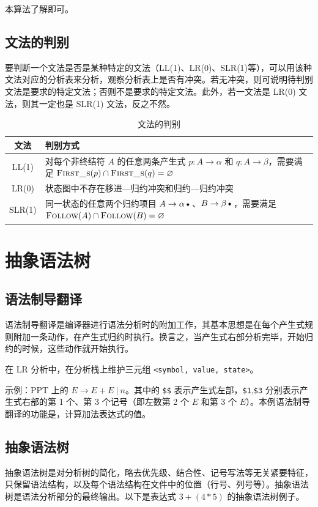 \documentclass[UTF8]{ctexart}
\newcommand\FOLLOW{\textsc{Follow}}
\newcommand\FIRSTS{\textsc{First\_s}}
\newcommand\D{\text{\textbullet}}
\newcommand\OR{\ |\ }
\newcommand\Emph[1]{\textcolor{cyan!80!black}{#1}}
\begin{document}
本算法了解即可。


\subsection{文法的判别}
要判断一个文法是否是某种特定的文法（LL(1)、LR(0)、SLR(1)等），可以用该种文法对应的\Emph{分析表}来分析，观察分析表上是否有冲突。若无冲突，则可说明待判别文法是要求的特定文法；否则不是要求的特定文法。此外，若一文法是 LR(0) 文法，则其一定也是 SLR(1) 文法，反之不然。

\begin{table}[htb]
  \centering
  \begin{tabular}{|c|p{}|}
    \hline
    文法 & 判别方式 \\
    \hline
    LL(1) & 对每个非终结符 $A$ 的任意两条产生式 $p:A\to\alpha$ 和 $q:A\to\beta$，需要满足 $\FIRSTS(p)\cap\FIRSTS(q)=\varnothing$ \\
    \hline
    LR(0) & 状态图中不存在移进—归约冲突和归约—归约冲突 \\
    \hline
    SLR(1) & 同一状态的任意两个归约项目 $A\to\alpha\D$、$B\to\beta\D$，需要满足 $\FOLLOW(A)\cap\FOLLOW(B)=\varnothing$ \\
    \hline
  \end{tabular}
  \caption{文法的判别}\label{tab:judgement}
\end{table}



\section{抽象语法树}
\subsection{语法制导翻译}
\Emph{语法制导翻译}是编译器进行语法分析时的附加工作，其基本思想是在每个产生式规则附加一条动作，在产生式归约时执行。换言之，当产生式右部分析完毕，开始归约的时候，这些动作就开始执行。

在 LR 分析中，在分析栈上维护三元组 \verb!<symbol, value, state>!。

示例：PPT 上的 $E \to E+E \OR n$。其中的 \verb!$$! 表示产生式左部，\verb!$1!,\verb!$3! 分别表示产生式右部的第 1 个、第 3 个记号（即左数第 2 个 $E$ 和第 3 个 $E$）。本例语法制导翻译的功能是，计算加法表达式的值。

\subsection{抽象语法树}
\Emph{抽象语法树}是对分析树的简化，略去优先级、结合性、记号写法等无关紧要特征，只保留语法结构，以及每个语法结构在文件中的\Emph{位置}（行号、列号等）。抽象语法树是语法分析部分的最终输出。以下是表达式 $3+(4*5)$ 的抽象语法树例子。
\end{document}
